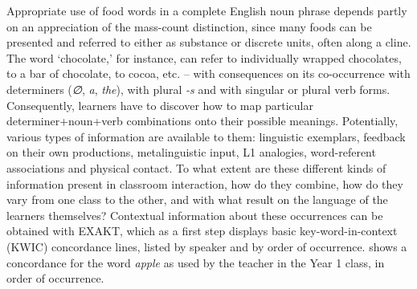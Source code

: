 \documentclass[output=paper,colorlinks,citecolor=brown,modfonts,nonflat]{../langscibook}
\begin{document}
Appropriate use of food words in a complete English noun phrase depends partly on an appreciation of the mass-count distinction, since many foods can be presented and referred to either as substance or discrete units, often along a cline. The word ‘chocolate,’ for instance, can refer to individually wrapped chocolates, to a bar of chocolate, to cocoa, etc. – with consequences on its co-occurrence with determiners (\textit{∅}, \textit{a}, \textit{the}), with plural \textit{{}-s} and with singular or plural verb forms. Consequently, learners have to discover how to map particular determiner+noun+verb combinations onto their possible meanings. Potentially, various types of information are available to them: linguistic exemplars, feedback on their own productions, metalinguistic input, L1 analogies, word-referent associations and physical contact. To what extent are these different kinds of information present in classroom interaction, how do they combine, how do they vary from one class to the other, and with what result on the language of the learners themselves? Contextual information about these occurrences can be obtained with EXAKT, which as a first step displays basic key-word-in-context (KWIC) concordance lines, listed by speaker and by order of occurrence.  shows a concordance for the word \textit{apple} as used by the teacher in the Year 1 class, in order of occurrence.
\end{document}
